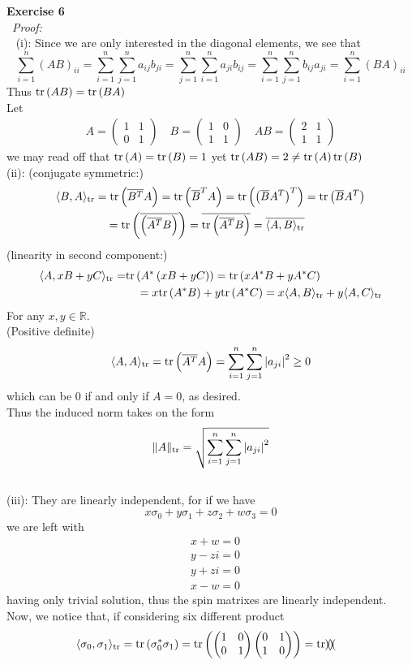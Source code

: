 \documentclass[12pt]{article}
\def\dotp#1#2{\langle#1,#2\rangle}
\def\ss#1#2{\sum_{#1=1}^{#2}}
\def\ep#1#2{{\bf Exercise #1}\\~{\it Proof:}\\~#2\\[1em]}
\def\inn#1#2{(#1): #2\\[0.5em]}
\def\cgu#1{\overline{#1}}
\def\tr#1{{\rm tr}\left(#1\right)}
\def\dotr#1#2{\dotp{#1}{#2}_{\rm tr}}
\def\lr#1#2#3{\left#1#3\right#2}
\newcommand{\R}{\mathbb{R}}
\newcommand{\eq}[1]{\begin{align*}#1\end{align*}}
\def\sg{\sigma}
\begin{document}
\ep{6}{
	\inn{i}{
	Since we are only interested in the diagonal elements, we see that
	\[
	\ss{i}{n}{(AB)}_{ii}=\ss{i}{n}\ss{j}{n}a_{ij}b_{ji}=\ss{j}{n}\ss{i}{n}a_{ji}b_{ij}=\ss{i}{n}\ss{j}{n}b_{ij}a_{ji}=\ss{i}{n}{(BA)}_{ii}
	\]
	Thus $\tr{AB}=\tr{BA}$\\
	Let 
	\eq{
	A=
	\begin{pmatrix}
				1 & 1 \\
				0 & 1
	\end{pmatrix}
	\quad
	B=
	\begin{pmatrix}
				1 & 0 \\
				1 & 1
	\end{pmatrix}
	\quad
	AB=
	\begin{pmatrix}
				2 & 1 \\
				1 & 1
	\end{pmatrix}
	}
	we may read off that $\tr{A}=\tr{B}=1$ yet $\tr{AB}=2\ne\tr{A}\tr{B}$
	}
	\inn{ii}{
	(conjugate symmetric:) 
	\eq{
	\dotr{B}{A}&=\tr{\cgu{B^T}A}=\tr{\cgu{B}^TA}=\tr{\lr(){\cgu{B}A^T}^T}=\tr{\cgu{B}A^T}\\
	&\quad=\tr{\cgu{\lr(){\cgu{A^T}B}}}=\cgu{\tr{\cgu{A^T}B}}=\cgu{\dotr{A}{B}}
	}
	(linearity in second component:) 
	\eq{
	\dotr{A}{xB+yC}=&\tr{A^*\lr(){xB+yC}}=\tr{xA^*B+yA^*C}\\
	&\quad =x\tr{A^*B}+y\tr{A^*C}=x\dotr{A}{B}+y\dotr{A}{C}
	}
	For any $x,y\in\R$.\\
	(Positive definite)
	\[
	\dotr{A}{A}=\tr{\cgu{A^T}A}=\ss{i}{n}\ss{j}{n}{|a_{ji}|}^2\ge0
	\]
	which can be $0$ if and only if $A=0$, as desired.\\
	Thus the induced norm takes on the form
	\[
	\|A\|_{\rm tr}=\sqrt{\ss{i}{n}\ss{j}{n}{|a_{ji}|}^2}
	\]
	}
	\inn{iii}{
	They are linearly independent, for if we have
	\[
	x\sg_0+y\sg_1+z\sg_2+w\sg_3=0
	\]
	we are left with
	\eq{
	&x+w=0\\
	&y-zi=0\\
	&y+zi=0\\
	&x-w=0
	}
	having only trivial solution, thus the spin matrixes are linearly independent.\\
	Now, we notice that, if considering six different product
	\eq{
	&\dotr{\sg_0}{\sg_1}=\tr{\sg_0^*\sg_1}=	
	\tr{
	\begin{pmatrix}
	1&0\\
	0&1
	\end{pmatrix}
	\begin{pmatrix}
	0&1\\
	1&0
	\end{pmatrix}
	}
	=\tr{\begin{pmatrix}

\end{pmatrix}}}}}
\end{document}
